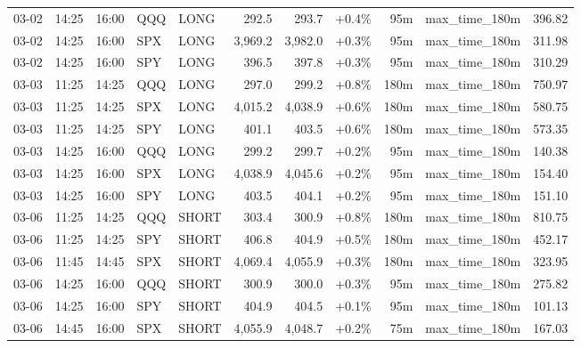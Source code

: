 \documentclass[11pt,a4paper,twoside]{article}
\begin{document}
\begin{center}
\begin{longtable}{>{\color{txtmain}}l l l l l r r r r >{\color{txtmain}}l r}
03-02 & 14:25 & 16:00 & QQQ & LONG & 292.5 & 293.7 & \textcolor{wingreen}{+0.4\%} & 95m & max\_time\_180m & \textcolor{wingreen}{396.82} \\
03-02 & 14:25 & 16:00 & SPX & LONG & 3,969.2 & 3,982.0 & \textcolor{wingreen}{+0.3\%} & 95m & max\_time\_180m & \textcolor{wingreen}{311.98} \\
03-02 & 14:25 & 16:00 & SPY & LONG & 396.5 & 397.8 & \textcolor{wingreen}{+0.3\%} & 95m & max\_time\_180m & \textcolor{wingreen}{310.29} \\
03-03 & 11:25 & 14:25 & QQQ & LONG & 297.0 & 299.2 & \textcolor{wingreen}{+0.8\%} & 180m & max\_time\_180m & \textcolor{wingreen}{750.97} \\
03-03 & 11:25 & 14:25 & SPX & LONG & 4,015.2 & 4,038.9 & \textcolor{wingreen}{+0.6\%} & 180m & max\_time\_180m & \textcolor{wingreen}{580.75} \\
03-03 & 11:25 & 14:25 & SPY & LONG & 401.1 & 403.5 & \textcolor{wingreen}{+0.6\%} & 180m & max\_time\_180m & \textcolor{wingreen}{573.35} \\
03-03 & 14:25 & 16:00 & QQQ & LONG & 299.2 & 299.7 & \textcolor{wingreen}{+0.2\%} & 95m & max\_time\_180m & \textcolor{wingreen}{140.38} \\
03-03 & 14:25 & 16:00 & SPX & LONG & 4,038.9 & 4,045.6 & \textcolor{wingreen}{+0.2\%} & 95m & max\_time\_180m & \textcolor{wingreen}{154.40} \\
03-03 & 14:25 & 16:00 & SPY & LONG & 403.5 & 404.1 & \textcolor{wingreen}{+0.2\%} & 95m & max\_time\_180m & \textcolor{wingreen}{151.10} \\
03-06 & 11:25 & 14:25 & QQQ & SHORT & 303.4 & 300.9 & \textcolor{wingreen}{+0.8\%} & 180m & max\_time\_180m & \textcolor{wingreen}{810.75} \\
03-06 & 11:25 & 14:25 & SPY & SHORT & 406.8 & 404.9 & \textcolor{wingreen}{+0.5\%} & 180m & max\_time\_180m & \textcolor{wingreen}{452.17} \\
03-06 & 11:45 & 14:45 & SPX & SHORT & 4,069.4 & 4,055.9 & \textcolor{wingreen}{+0.3\%} & 180m & max\_time\_180m & \textcolor{wingreen}{323.95} \\
03-06 & 14:25 & 16:00 & QQQ & SHORT & 300.9 & 300.0 & \textcolor{wingreen}{+0.3\%} & 95m & max\_time\_180m & \textcolor{wingreen}{275.82} \\
03-06 & 14:25 & 16:00 & SPY & SHORT & 404.9 & 404.5 & \textcolor{wingreen}{+0.1\%} & 95m & max\_time\_180m & \textcolor{wingreen}{101.13} \\
03-06 & 14:45 & 16:00 & SPX & SHORT & 4,055.9 & 4,048.7 & \textcolor{wingreen}{+0.2\%} & 75m & max\_time\_180m & \textcolor{wingreen}{167.03} \\

\end{longtable}
\end{center}
\end{document}
